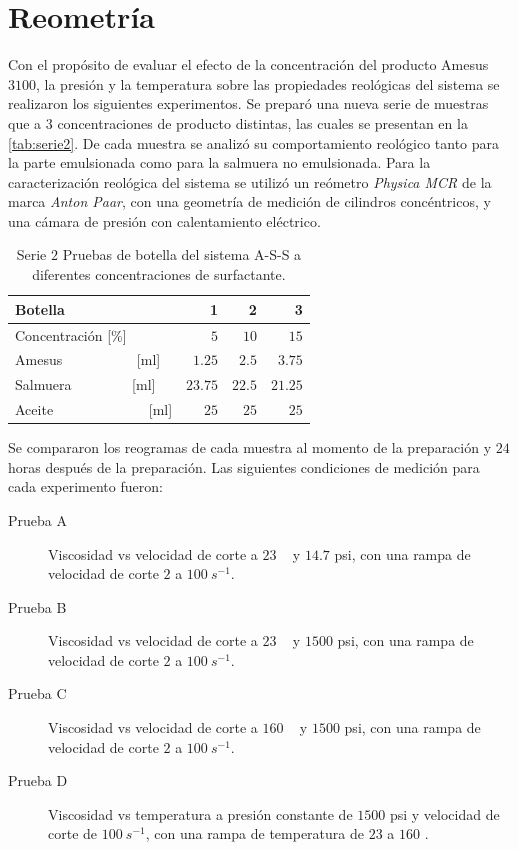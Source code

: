 \section{Reometría}
Con  el  propósito  de  evaluar  el  efecto  de  la  concentración  del producto Amesus $3100$, la presión y la temperatura sobre las propiedades reológicas del sistema se realizaron los siguientes experimentos. Se preparó una nueva serie de muestras que a $3$ concentraciones de producto distintas, las cuales se presentan en la \autoref{tab:serie2}. De cada muestra se analizó su comportamiento reológico tanto para la parte emulsionada como para la salmuera no emulsionada. Para la caracterización reológica del sistema se utilizó un reómetro \emph{Physica MCR} de la marca \emph{Anton Paar}, con una geometría de medición de cilindros concéntricos, y una cámara de presión con calentamiento eléctrico.

 \begin{table} 
    \caption[Efecto de la concentración]{Serie $2$ Pruebas de botella del sistema A-S-S a diferentes concentraciones de surfactante.}
    \centering
    \begin{tabulary}{1.1\textwidth}{L |R|R|R|}
        \toprule
        Botella & \textbf{1} & \textbf{2} & \textbf{3} \\
        \midrule
        Concentración [\%] & $5$  & $10$ & $15$ \\
        Amesus ~~~~~~~~~~[ml] & $1.25$  & $2.5$ & $3.75$  \\
        Salmuera ~~~~~~~~[ml] & $23.75$ & $22.5$ & $21.25$ \\
        Aceite ~~~~~~~~~~~~~[ml] & $25$ & $25$ & $25$  \\
        \midrule
        \bottomrule
    \end{tabulary}
    \label{tab:serie2}
\end{table}

Se compararon los reogramas de cada muestra al momento de la preparación y $24$ horas después de la preparación. Las siguientes condiciones de medición para cada experimento fueron:

\begin{description}
    \item [Prueba A] Viscosidad vs velocidad de corte a $23$ \celsius~ y $14.7$ psi, con una rampa de velocidad de corte $2$ a $100 ~ s^{-1}$.
    \item [Prueba B] Viscosidad vs velocidad de corte a $23$ \celsius~ y $1500$ psi, con una rampa de velocidad de corte $2$ a $100 ~ s^{-1}$.
    \item [Prueba C] Viscosidad vs velocidad de corte a $160$ \celsius~ y $1500$ psi, con una rampa de velocidad de corte $2$ a $100 ~ s^{-1}$.
    \item [Prueba D] Viscosidad vs temperatura a presión constante de $1500$ psi y velocidad de corte de $100 ~ s^{-1}$, con una rampa de temperatura de $23$ a $160$ \celsius.
\end{description}

